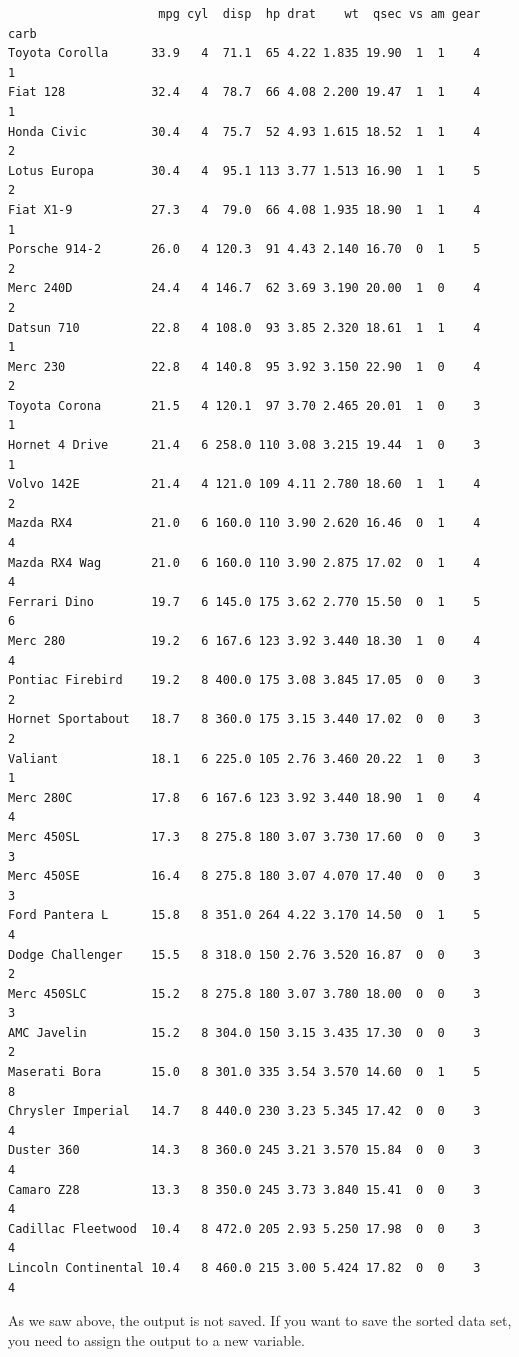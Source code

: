 \documentclass[
  letterpaper,
  DIV=11,
  numbers=noendperiod]{scrreprt}
\begin{document}
\begin{verbatim}
                     mpg cyl  disp  hp drat    wt  qsec vs am gear carb
Toyota Corolla      33.9   4  71.1  65 4.22 1.835 19.90  1  1    4    1
Fiat 128            32.4   4  78.7  66 4.08 2.200 19.47  1  1    4    1
Honda Civic         30.4   4  75.7  52 4.93 1.615 18.52  1  1    4    2
Lotus Europa        30.4   4  95.1 113 3.77 1.513 16.90  1  1    5    2
Fiat X1-9           27.3   4  79.0  66 4.08 1.935 18.90  1  1    4    1
Porsche 914-2       26.0   4 120.3  91 4.43 2.140 16.70  0  1    5    2
Merc 240D           24.4   4 146.7  62 3.69 3.190 20.00  1  0    4    2
Datsun 710          22.8   4 108.0  93 3.85 2.320 18.61  1  1    4    1
Merc 230            22.8   4 140.8  95 3.92 3.150 22.90  1  0    4    2
Toyota Corona       21.5   4 120.1  97 3.70 2.465 20.01  1  0    3    1
Hornet 4 Drive      21.4   6 258.0 110 3.08 3.215 19.44  1  0    3    1
Volvo 142E          21.4   4 121.0 109 4.11 2.780 18.60  1  1    4    2
Mazda RX4           21.0   6 160.0 110 3.90 2.620 16.46  0  1    4    4
Mazda RX4 Wag       21.0   6 160.0 110 3.90 2.875 17.02  0  1    4    4
Ferrari Dino        19.7   6 145.0 175 3.62 2.770 15.50  0  1    5    6
Merc 280            19.2   6 167.6 123 3.92 3.440 18.30  1  0    4    4
Pontiac Firebird    19.2   8 400.0 175 3.08 3.845 17.05  0  0    3    2
Hornet Sportabout   18.7   8 360.0 175 3.15 3.440 17.02  0  0    3    2
Valiant             18.1   6 225.0 105 2.76 3.460 20.22  1  0    3    1
Merc 280C           17.8   6 167.6 123 3.92 3.440 18.90  1  0    4    4
Merc 450SL          17.3   8 275.8 180 3.07 3.730 17.60  0  0    3    3
Merc 450SE          16.4   8 275.8 180 3.07 4.070 17.40  0  0    3    3
Ford Pantera L      15.8   8 351.0 264 4.22 3.170 14.50  0  1    5    4
Dodge Challenger    15.5   8 318.0 150 2.76 3.520 16.87  0  0    3    2
Merc 450SLC         15.2   8 275.8 180 3.07 3.780 18.00  0  0    3    3
AMC Javelin         15.2   8 304.0 150 3.15 3.435 17.30  0  0    3    2
Maserati Bora       15.0   8 301.0 335 3.54 3.570 14.60  0  1    5    8
Chrysler Imperial   14.7   8 440.0 230 3.23 5.345 17.42  0  0    3    4
Duster 360          14.3   8 360.0 245 3.21 3.570 15.84  0  0    3    4
Camaro Z28          13.3   8 350.0 245 3.73 3.840 15.41  0  0    3    4
Cadillac Fleetwood  10.4   8 472.0 205 2.93 5.250 17.98  0  0    3    4
Lincoln Continental 10.4   8 460.0 215 3.00 5.424 17.82  0  0    3    4
\end{verbatim}

As we saw above, the output is not saved. If you want to save the sorted
data set, you need to assign the output to a new variable.
\end{document}
